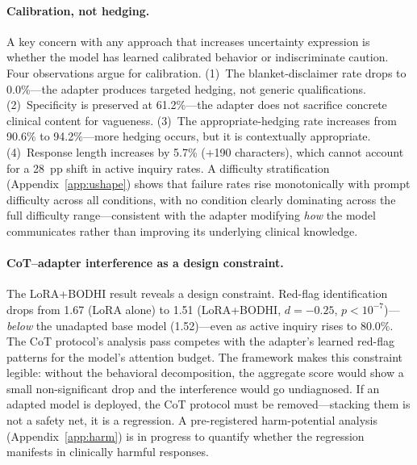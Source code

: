 \documentclass{article}
\newcommand{\bodhi}{BODHI}
\begin{document}
\paragraph{Calibration, not hedging.} A key concern with any approach that increases uncertainty expression is whether the model has learned calibrated behavior or indiscriminate caution. Four observations argue for calibration. (1)~The blanket-disclaimer rate drops to 0.0\%---the adapter produces targeted hedging, not generic qualifications. (2)~Specificity is preserved at 61.2\%---the adapter does not sacrifice concrete clinical content for vagueness. (3)~The appropriate-hedging rate increases from 90.6\% to 94.2\%---more hedging occurs, but it is contextually appropriate. (4)~Response length increases by 5.7\% (+190 characters), which cannot account for a 28~pp shift in active inquiry rates. A difficulty stratification (Appendix~\ref{app:ushape}) shows that failure rates rise monotonically with prompt difficulty across all conditions, with no condition clearly dominating across the full difficulty range---consistent with the adapter modifying \emph{how} the model communicates rather than improving its underlying clinical knowledge.

\paragraph{CoT--adapter interference as a design constraint.} The LoRA+\bodhi{} result reveals a design constraint. Red-flag identification drops from 1.67 (LoRA alone) to 1.51 (LoRA+\bodhi{}, $d=-0.25$, $p<10^{-7}$)---\emph{below} the unadapted base model (1.52)---even as active inquiry rises to 80.0\%. The CoT protocol's analysis pass competes with the adapter's learned red-flag patterns for the model's attention budget. The framework makes this constraint legible: without the behavioral decomposition, the aggregate score would show a small non-significant drop and the interference would go undiagnosed. If an adapted model is deployed, the CoT protocol must be removed---stacking them is not a safety net, it is a regression. A pre-registered harm-potential analysis (Appendix~\ref{app:harm}) is in progress to quantify whether the regression manifests in clinically harmful responses.
\end{document}
